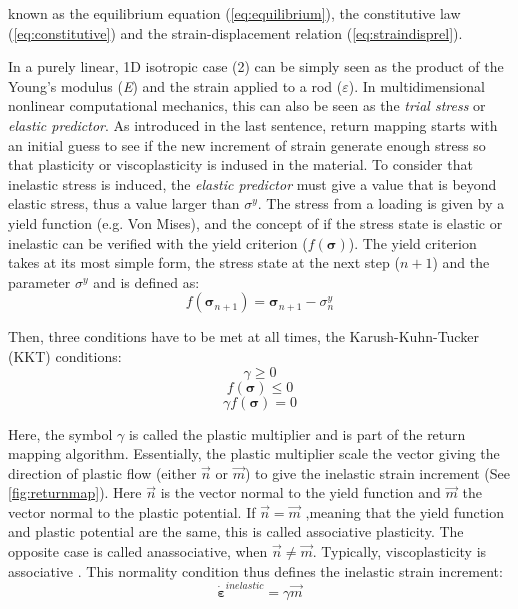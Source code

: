\documentclass[final,5p,times,twocolumn]{elsarticle}
\begin{document}
known as the equilibrium equation (\cref{eq:equilibrium}), the constitutive law (\cref{eq:constitutive}) and  the strain-displacement relation (\cref{eq:straindisprel}). 

In a purely linear, 1D isotropic case (2) can be simply seen as the product of the Young's modulus (\textit{E}) and the strain applied to a rod ($\varepsilon$). In multidimensional nonlinear computational mechanics, this can also be seen as the \textit{trial stress} or \textit{elastic predictor}. As introduced in the last sentence, return mapping starts with an initial guess to see if the new increment of strain generate enough stress so that plasticity or viscoplasticity is indused in the material. To consider that inelastic stress is induced, the \textit{elastic predictor} must give a value that is beyond elastic stress, thus a value larger than $\sigma^{y}$. The stress from a loading is given by a yield function (e.g. Von Mises), and the concept of if the stress state is elastic or inelastic can be verified with the yield criterion ($f(\boldsymbol{\sigma})$). The yield criterion takes at its most simple form, the stress state at the next step ($n+1$) and the parameter $\sigma^{y}$ and is defined as:
\begin{equation}
  f (\boldsymbol{\sigma}_{n+1}) = \boldsymbol{\sigma}_{n+1} - \sigma^{y}_{n} \label{eq:yieldcrit_simple}
\end{equation}

Then, three conditions have to be met at all times, the Karush-Kuhn-Tucker (KKT) conditions:
\begin{equation}
  \gamma \geq 0 \label{eq:kkt1}
\end{equation}
\begin{equation}
  f(\boldsymbol{\sigma}) \leq 0 \label{eq:kkt2}
\end{equation}
\begin{equation}
  \gamma f(\boldsymbol{\sigma})  = 0 \label{eq:kkt3}
\end{equation}


Here, the symbol $\gamma$ is called the plastic multiplier and is part of the return mapping algorithm. Essentially, the plastic multiplier scale the vector giving the direction of plastic flow (either $\vec{n}$ or $\vec{m}$) to give the inelastic strain increment (See \cref{fig:returnmap}). Here $\vec{n}$ is the vector normal to the yield function and $\vec{m}$ the vector normal to the plastic potential. If $\vec{n}=\vec{m}$ ,meaning that the yield function and plastic potential are the same, this is called associative plasticity. The opposite case is called anassociative, when $\vec{n} \neq \vec{m}$. Typically, viscoplasticity is associative \cite{MACrisfield2012,Simo1998Computational}. This normality condition thus defines the inelastic strain increment:
\begin{equation}
  \boldsymbol{\dot{\varepsilon}}^{inelastic}=\gamma \vec{m} \label{eq:normality}
\end{equation}
\end{document}
